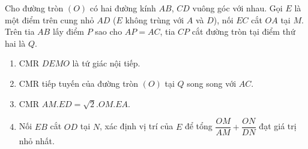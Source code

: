 \begin{ex}%
Cho đường tròn $(O)$ có hai đường kính $AB$, $CD$ vuông góc với nhau. Gọi $E$ là một điểm trên cung nhỏ $AD$ ($E$ không trùng với $A$ và $D$), nối $EC$ cắt $OA$ tại $M$. Trên tia $AB$ lấy điểm $P$ sao cho $AP=AC$, tia $CP$ cắt đường tròn tại điểm thứ hai là $Q$.
\begin{enumerate}[1.]
\item CMR $DEMO$ là tứ giác nội tiếp.
\item CMR tiếp tuyến của đường tròn $(O)$ tại $Q$ song song với $AC$.
\item CMR $AM.ED=\sqrt{2}.OM.EA$.
\item Nối $EB$ cắt $OD$ tại $N$, xác định vị trí của $E$ để tổng $\dfrac{OM}{AM}+\dfrac{ON}{DN}$ đạt giá trị nhỏ nhất.
\end{enumerate}
\end{ex}
